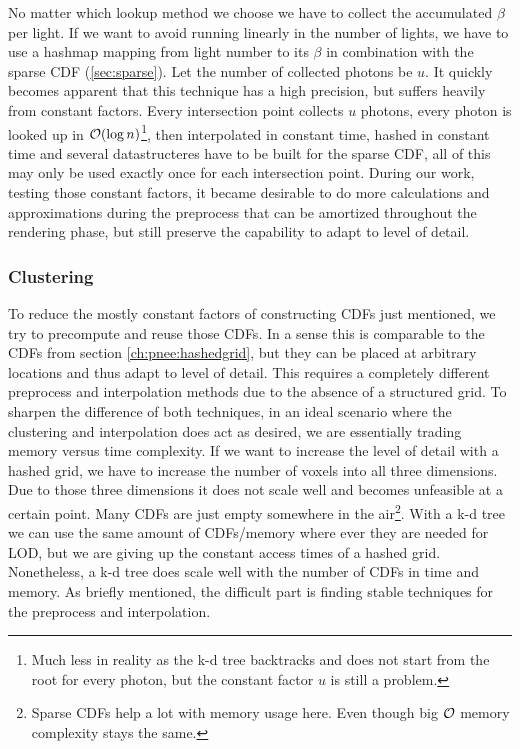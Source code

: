 No matter which lookup method we choose we have to collect the accumulated $\beta$ per light. If we want to avoid running linearly in the number of lights, we have to use a hashmap mapping from light number to its $\beta$ in combination with the sparse CDF (\ref{sec:sparse}). Let the number of collected photons be $u$. It quickly becomes apparent that this technique has a high precision, but suffers heavily from constant factors. Every intersection point collects $u$ photons, every photon is looked up in $\mathcal{O}(\log n)$\footnote{Much less in reality as the k-d tree backtracks and does not start from the root for every photon, but the constant factor $u$ is still a problem.}, then interpolated in constant time, hashed in constant time and several datastructeres have to be built for the sparse CDF, all of this may only be used exactly once for each intersection point. During our work, testing those constant factors, it became desirable to do more calculations and approximations during the preprocess that can be amortized throughout the rendering phase, but still preserve the capability to adapt to level of detail.

\subsubsection{Clustering}

To reduce the mostly constant factors of constructing CDFs just mentioned, we try to precompute and reuse those CDFs. In a sense this is comparable to the CDFs from section \ref{ch:pnee:hashedgrid}, but they can be placed at arbitrary locations and thus adapt to level of detail. This requires a completely different preprocess and interpolation methods due to the absence of a structured grid. To sharpen the difference of both techniques, in an ideal scenario where the clustering and interpolation does act as desired, we are essentially trading memory versus time complexity. If we want to increase the level of detail with a hashed grid, we have to increase the number of voxels into all three dimensions. Due to those three dimensions it does not scale well and becomes unfeasible at a certain point. Many CDFs are just empty somewhere in the air\footnote{Sparse CDFs help a lot with memory usage here. Even though big $\mathcal{O}$ memory complexity stays the same.}. With a k-d tree we can use the same amount of CDFs/memory where ever they are needed for LOD, but we are giving up the constant access times of a hashed grid. Nonetheless, a k-d tree does scale well with the number of CDFs in time and memory. As briefly mentioned, the difficult part is finding stable techniques for the preprocess and interpolation.

